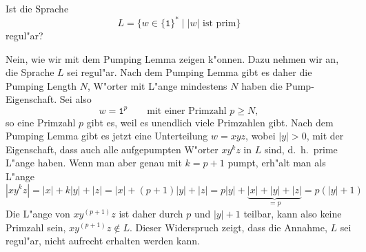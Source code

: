 Ist die Sprache
\[
L=\{w\in\{\texttt{1}\}^*\;|\;\text{$|w|$ ist prim}\}
\]
regul"ar?

\begin{loesung}
Nein, wie wir mit dem Pumping Lemma zeigen k"onnen.
Dazu nehmen wir an, die Sprache $L$ sei regul"ar.
Nach dem Pumping Lemma gibt es daher die Pumping Length $N$, W"orter
mit L"ange mindestens $N$ haben die Pump-Eigenschaft.
Sei also 
\[
w=\texttt{1}^p\qquad\text{mit einer Primzahl $p\ge N$},
\]
so eine Primzahl $p$ gibt es, weil es unendlich viele Primzahlen gibt.
Nach dem Pumping Lemma gibt es jetzt eine Unterteilung $w=xyz$, wobei
$|y|>0$, mit der Eigenschaft, dass auch alle aufgepumpten W"orter
$xy^kz$ in $L$ sind, d.~h.~prime L"ange haben.
Wenn man aber genau mit $k=p+1$ pumpt, erh"alt man als L"ange
\[
|xy^kz|
=
|x| + k|y| + |z|
=
|x| + (p+1)|y| + |z|
=
p|y| + \underbrace{|x|+|y|+|z|}_{\textstyle=p}
=
p(|y|+1)
\]
Die L"ange von $xy^{(p+1)}z$ ist daher durch $p$ und $|y|+1$ teilbar, kann also
keine Primzahl sein, $xy^{(p+1)}z\not\in L$.
Dieser Widerspruch zeigt, dass die Annahme, $L$ sei regul"ar, nicht
aufrecht erhalten werden kann.
\end{loesung}


